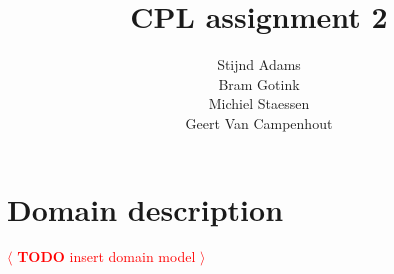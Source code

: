 \documentclass[a4paper,11pt]{article}
\newcommand{\todo}[1]{\textcolor{red}{\(\langle\) \textbf{TODO} #1 \(\rangle\) }}
\begin{document}
\title{CPL assignment 2}
\author{ Stijnd Adams \\ Bram Gotink \\ Michiel Staessen \\ Geert Van Campenhout }

\maketitle

\tableofcontents

\clearpage

\section{Domain description}

\todo{insert domain model}
\end{document}
